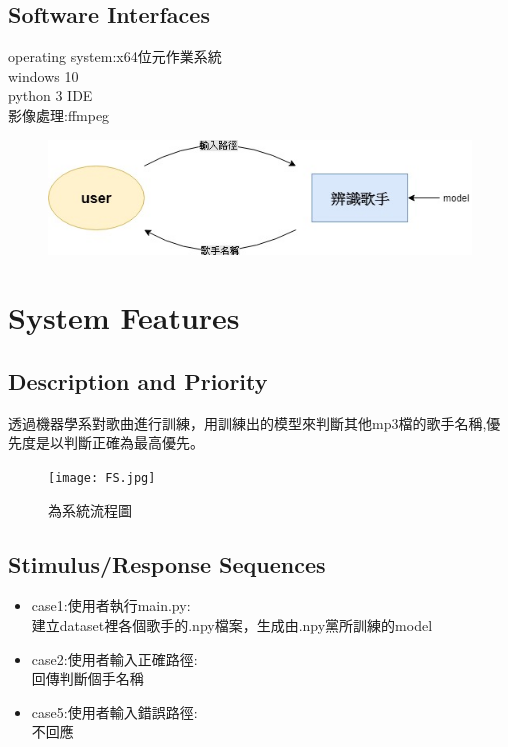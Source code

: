 \documentclass{article}
\begin{document}
\begin{CJK}{UTF8}{bkai}
\newpage
\subsection{\Large Software Interfaces\\}
operating system:x64位元作業系統 \\
 windows 10\\
python 3 IDE \\
影像處理:ffmpeg\\
\begin{figure}[h]
\begin{center}
\includegraphics[width=13cm]{software_interface.jpg}
\end{center}
\label{fig:5}
\end{figure}
\newpage



\section{\huge\bf \color{blue}  System Features }
\subsection{\Large Description and Priority }
	
	透過機器學系對歌曲進行訓練，用訓練出的模型來判斷其他mp3檔的歌手名稱,優先度是以判斷正確為最高優先。
\begin{figure}[h]
\begin{center}
\texttt{[image: FS.jpg]}
\end{center}
\caption{為系統流程圖}
\label{fig:6}
\end{figure}

\subsection{\Large Stimulus/Response Sequences}
	\begin{itemize}
		\item case1:使用者執行main.py:\\
			建立dataset裡各個歌手的.npy檔案，生成由.npy黨所訓練的model
		\item case2:使用者輸入正確路徑:\\
			回傳判斷個手名稱
		\item case5:使用者輸入錯誤路徑:\\
			不回應
	\end{itemize} 

\end{CJK}
\end{document}

